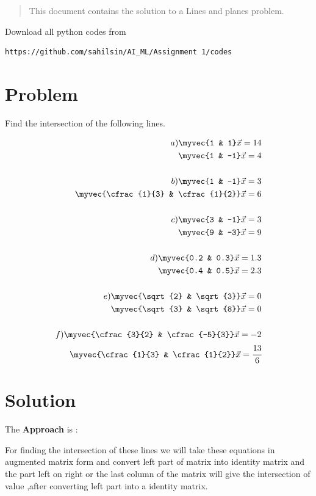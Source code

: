 \begin{enumerate}[label=\thesection.\arabic*.,ref=\thesection.\theenumi]

\begin{abstract}
This document contains the solution to a Lines and planes problem.
\end{abstract}
Download all python codes from 
%
\begin{lstlisting}
https://github.com/sahilsin/AI_ML/Assignment 1/codes
\end{lstlisting}

\section{Problem}



Find the intersection of the following lines.

\begin{align*}
a)  \myvec{1  &  1}\vec{x}=14
\\
    \myvec{1 & -1}\vec{x}=4
\\ \\
b)    \myvec{1  &  -1}\vec{x}=3
\\
    \myvec{\cfrac{1}{3} & \cfrac{1}{2}}\vec{x}=6
\\ \\
c)    \myvec{3  &  -1}\vec{x}=3
\\
    \myvec{9 & -3}\vec{x}=9
\\ \\
d)    \myvec{0.2  &  0.3}\vec{x}=1.3
\\
    \myvec{0.4 & 0.5}\vec{x}=2.3
\\ \\
e)    \myvec{\sqrt{2}  &  \sqrt{3}}\vec{x}=0
\\
    \myvec{\sqrt{3} & \sqrt{8}}\vec{x}=0
\\ \\
f)    \myvec{\cfrac{3}{2}  &  \cfrac{-5}{3}}\vec{x}=-2
\\
    \myvec{\cfrac{1}{3} & \cfrac{1}{2}}\vec{x}=\cfrac{13}{6}
\end{align*}


\section{Solution}
The \textbf{Approach} is :
\begin{flushleft}
    For finding the intersection of these lines we will take these equations in augmented matrix form and convert left part of matrix into identity matrix and the part left on right or the last column of the matrix will give the intersection of value ,after converting left part into a identity matrix.
\end{flushleft}


\end{enumerate}
